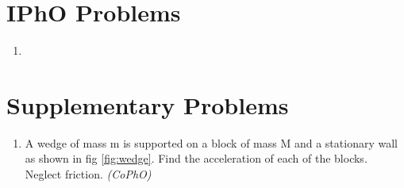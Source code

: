 \section{IPhO Problems}
\begin{enumerate}
    \item 
\end{enumerate}
\section{Supplementary Problems}
\begin{enumerate}
    \item A wedge of mass m  is supported on a block of mass M and a stationary wall as shown in fig \ref{fig:wedge}. Find the acceleration of each of the blocks. Neglect friction.
    \hfill \textsl{(CoPhO)}


\end{enumerate}
